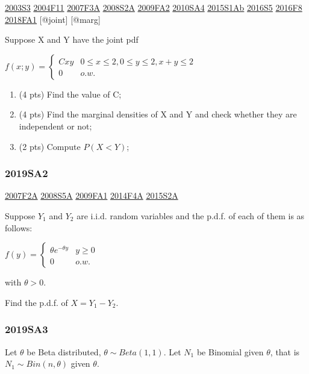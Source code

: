 \documentclass[6pt,twocolumn,Portrait]{article}
\begin{document}
\protect\hyperlink{s3}{2003S3} \protect\hyperlink{f11}{2004F11}
\protect\hyperlink{f3a}{2007F3A} \protect\hyperlink{s2a}{2008S2A}
\protect\hyperlink{fa2}{2009FA2} \protect\hyperlink{sa4-1}{2010SA4}
\protect\hyperlink{s1ab}{2015S1Ab} \protect\hyperlink{s5-4}{2016S5}
\protect\hyperlink{f8-4}{2016F8} \protect\hyperlink{fa1-4}{2018FA1}
{[}@joint{]} {[}@marg{]}

Suppose X and Y have the joint pdf

\(f(x;y) =\begin{cases}Cxy& 0\le x\le 2, 0\le y\le 2, x + y\le 2\\0& o.w.\end{cases}\)

\begin{enumerate}
\def\labelenumi{(\alph{enumi})}
\item
  (4 pts) Find the value of C;
\item
  (4 pts) Find the marginal densities of X and Y and check whether they
  are independent or not;
\item
  (2 pts) Compute \(P(X<Y)\);
\end{enumerate}

\hypertarget{sa2-3}{%
\subsubsection{2019SA2}\label{sa2-3}}

\protect\hyperlink{f2a}{2007F2A} \protect\hyperlink{s5a}{2008S5A}
\protect\hyperlink{fa1}{2009FA1} \protect\hyperlink{f4a-1}{2014F4A}
\protect\hyperlink{s2a-1}{2015S2A}

Suppose \(Y_1\) and \(Y_2\) are i.i.d. random variables and the p.d.f.
of each of them is as follows:

\(f(y)=\begin{cases}\theta e^{-\theta y}& y\ge0\\0& o.w.\end{cases}\)

with \(\theta>0\).

Find the p.d.f. of \(X=Y_1-Y_2\).

\hypertarget{sa3-3}{%
\subsubsection{2019SA3}\label{sa3-3}}

Let \(\theta\) be Beta distributed, \(\theta\sim Beta(1,1)\). Let
\(N_1\) be Binomial given \(\theta\), that is \(N_1\sim Bin(n,\theta)\)
given \(\theta\).
\end{document}
